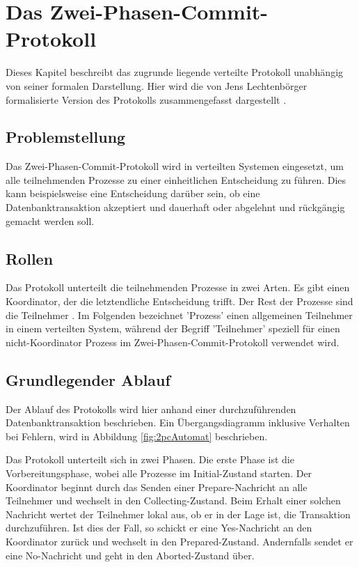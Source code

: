 \documentclass[12pt,a4paper]{tucarticle2019}
\begin{document}
	\newpage
	\section{Das Zwei-Phasen-Commit-Protokoll}
	Dieses Kapitel beschreibt das zugrunde liegende verteilte Protokoll unabhängig von seiner formalen Darstellung. Hier wird die von Jens Lechtenbörger formalisierte Version des Protokolls zusammengefasst dargestellt \cite{tupacSpec}.
	\subsection{Problemstellung}
	Das Zwei-Phasen-Commit-Protokoll wird in verteilten Systemen eingesetzt, um alle teilnehmenden Prozesse zu einer einheitlichen Entscheidung zu führen. Dies kann beispielsweise eine Entscheidung darüber sein, ob eine Datenbanktransaktion akzeptiert und dauerhaft oder abgelehnt und rückgängig gemacht werden soll.
	\subsection{Rollen}
	Das Protokoll unterteilt die teilnehmenden Prozesse in zwei Arten. Es gibt einen Koordinator, der die letztendliche Entscheidung trifft. Der Rest der Prozesse sind die Teilnehmer \cite{tupacSpec}. Im Folgenden bezeichnet 'Prozess' einen allgemeinen Teilnehmer in einem verteilten System, während der Begriff 'Teilnehmer' speziell für einen nicht-Koordinator Prozess im Zwei-Phasen-Commit-Protokoll verwendet wird.
	\subsection{Grundlegender Ablauf}
	Der Ablauf des Protokolls wird hier anhand einer durchzuführenden Datenbanktransaktion beschrieben. Ein Übergangsdiagramm inklusive Verhalten bei Fehlern, wird in Abbildung \ref{fig:2pcAutomat} beschrieben. 
	
	Das Protokoll unterteilt sich in zwei Phasen. Die erste Phase ist die Vorbereitungsphase, wobei alle Prozesse im Initial-Zustand starten.
	Der Koordinator beginnt durch das Senden einer Prepare-Nachricht an alle Teilnehmer und wechselt in den Collecting-Zustand. Beim Erhalt einer solchen Nachricht wertet der Teilnehmer lokal aus, ob er in der Lage ist, die Transaktion durchzuführen. Ist dies der Fall, so schickt er eine Yes-Nachricht an den Koordinator zurück und wechselt in den Prepared-Zustand. Andernfalls sendet er eine No-Nachricht und geht in den Aborted-Zustand über. 
	
\end{document}
